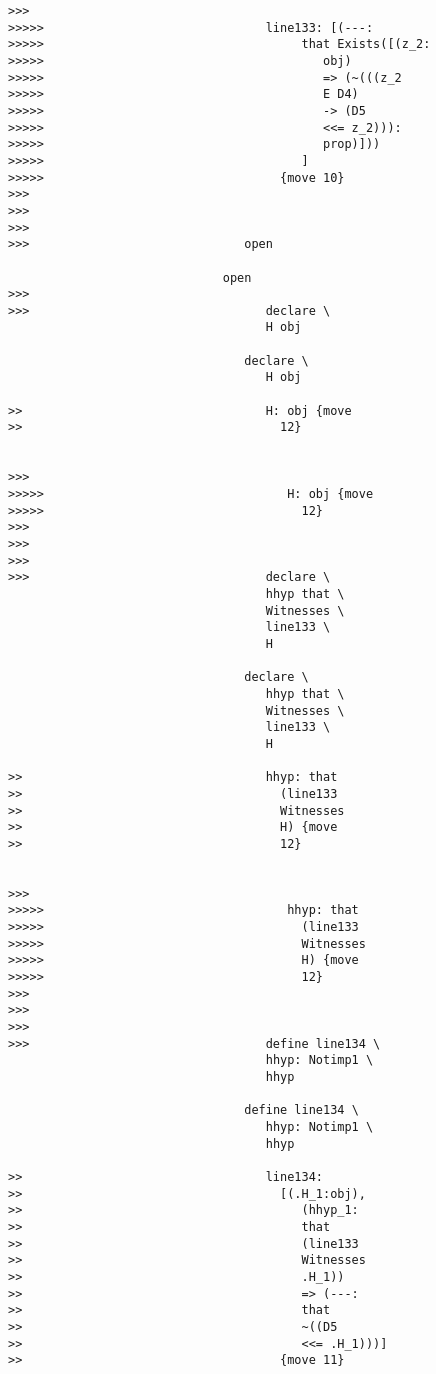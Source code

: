 \documentclass[12pt]{article}
\begin{document}
\begin{verbatim}
>>>
>>>>>                               line133: [(---:
>>>>>                                    that Exists([(z_2:
>>>>>                                       obj)
>>>>>                                       => (~(((z_2
>>>>>                                       E D4)
>>>>>                                       -> (D5
>>>>>                                       <<= z_2))):
>>>>>                                       prop)]))
>>>>>                                    ]
>>>>>                                 {move 10}
>>>
>>>
>>>
>>>                              open

                              open
>>>
>>>                                 declare \
                                    H obj

                                 declare \
                                    H obj

>>                                  H: obj {move
>>                                    12}


>>>
>>>>>                                  H: obj {move
>>>>>                                    12}
>>>
>>>
>>>
>>>                                 declare \
                                    hhyp that \
                                    Witnesses \
                                    line133 \
                                    H

                                 declare \
                                    hhyp that \
                                    Witnesses \
                                    line133 \
                                    H

>>                                  hhyp: that
>>                                    (line133
>>                                    Witnesses
>>                                    H) {move
>>                                    12}


>>>
>>>>>                                  hhyp: that
>>>>>                                    (line133
>>>>>                                    Witnesses
>>>>>                                    H) {move
>>>>>                                    12}
>>>
>>>
>>>
>>>                                 define line134 \
                                    hhyp: Notimp1 \
                                    hhyp

                                 define line134 \
                                    hhyp: Notimp1 \
                                    hhyp

>>                                  line134:
>>                                    [(.H_1:obj),
>>                                       (hhyp_1:
>>                                       that
>>                                       (line133
>>                                       Witnesses
>>                                       .H_1))
>>                                       => (---:
>>                                       that
>>                                       ~((D5
>>                                       <<= .H_1)))]
>>                                    {move 11}



\end{verbatim}
\end{document}

